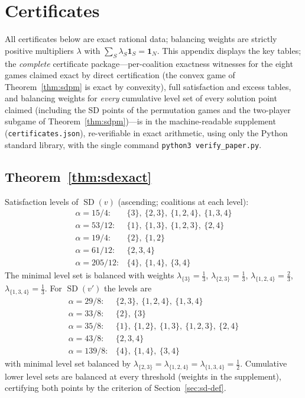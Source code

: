 \documentclass[11pt]{article}
\newcommand{\SD}{\operatorname{SD}}
\begin{document}
\appendix

\section{Certificates}\label{app:certs}

All certificates below are exact rational data; balancing weights are
strictly positive multipliers $\lambda$ with
$\sum_S\lambda_S\mathbf{1}_S=\mathbf{1}_N$. This appendix displays the key
tables; the \emph{complete} certificate package---per-coalition exactness
witnesses for the eight games claimed exact by direct certification (the
convex game of Theorem~\ref{thm:sdpm} is exact by convexity), full
satisfaction and excess tables, and balancing weights for \emph{every}
cumulative level set of every solution point claimed (including the SD
points of the permutation games and the two-player subgame of
Theorem~\ref{thm:sdpm})---is in the machine-readable supplement
(\texttt{certificates.json}), re-verifiable in exact arithmetic, using only
the Python standard library, with the single command
\texttt{python3 verify\_paper.py}.

\subsection*{Theorem~\ref{thm:sdexact}}

Satisfaction levels of $\SD(v)$ (ascending; coalitions at each level):
\[
\begin{array}{ll}
\alpha=15/4:& \{3\},\ \{2,3\},\ \{1,2,4\},\ \{1,3,4\}\\
\alpha=53/12:& \{1\},\ \{1,3\},\ \{1,2,3\},\ \{2,4\}\\
\alpha=19/4:& \{2\},\ \{1,2\}\\
\alpha=61/12:& \{2,3,4\}\\
\alpha=205/12:& \{4\},\ \{1,4\},\ \{3,4\}
\end{array}
\]
The minimal level set is balanced with weights
$\lambda_{\{3\}}=\tfrac13$, $\lambda_{\{2,3\}}=\tfrac13$,
$\lambda_{\{1,2,4\}}=\tfrac23$, $\lambda_{\{1,3,4\}}=\tfrac13$. For
$\SD(v')$ the levels are
\[
\begin{array}{ll}
\alpha=29/8:& \{2,3\},\ \{1,2,4\},\ \{1,3,4\}\\
\alpha=33/8:& \{2\},\ \{3\}\\
\alpha=35/8:& \{1\},\ \{1,2\},\ \{1,3\},\ \{1,2,3\},\ \{2,4\}\\
\alpha=43/8:& \{2,3,4\}\\
\alpha=139/8:& \{4\},\ \{1,4\},\ \{3,4\}
\end{array}
\]
with minimal level set balanced by
$\lambda_{\{2,3\}}=\lambda_{\{1,2,4\}}=\lambda_{\{1,3,4\}}=\tfrac12$.
Cumulative lower level sets are balanced at every threshold (weights in the
supplement), certifying both points by the criterion of
Section~\ref{sec:sd-def}.
\end{document}
